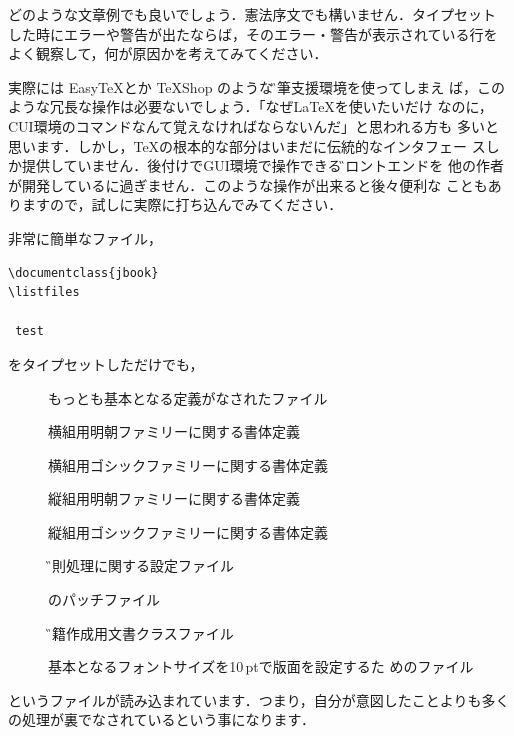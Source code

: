 \begin{description}
 どのような文章例でも良いでしょう．憲法序文でも構いません．タイプセット
 した時にエラーや警告が出たならば，そのエラー・警告が表示されている行を
 よく観察して，何が原因かを考えてみてください．

 実際には Easy\TeX とか \TeX Shop のような\G{執筆支援環境}を使ってしまえ
 ば，このような冗長な操作は必要ないでしょう．「なぜ\LaTeX を使いたいだけ
 なのに，CUI環境のコマンドなんて覚えなければならないんだ」と思われる方も
 多いと思います．しかし，\TeX の根本的な部分はいまだに伝統的なインタフェー
 スしか提供していません．後付けでGUI環境で操作できる\G{フロントエンド}を
 他の作者が開発しているに過ぎません．このような操作が出来ると後々便利な
 こともありますので，試しに実際に打ち込んでみてください．

非常に簡単なファイル，
\begin{verbatim}
\documentclass{jbook}
\listfiles

 test

\end{verbatim}
をタイプセットしただけでも，
\begin{description}
\item[] もっとも基本となる定義がなされたファイル
\item[] 横組用明朝ファミリーに関する書体定義
\item[] 横組用ゴシックファミリーに関する書体定義
\item[] 縦組用明朝ファミリーに関する書体定義
\item[] 縦組用ゴシックファミリーに関する書体定義
\item[] \G{禁則処理}に関する設定ファイル
\item[] \pLaTeX のパッチファイル
\item[] \G{書籍作成}用文書クラスファイル
\item[] 基本となるフォントサイズを10\,ptで版面を設定するた
	     めのファイル
\end{description}
というファイルが読み込まれています．つまり，自分が意図したことよりも多く
の処理が裏でなされているという事になります．


\end{description}
